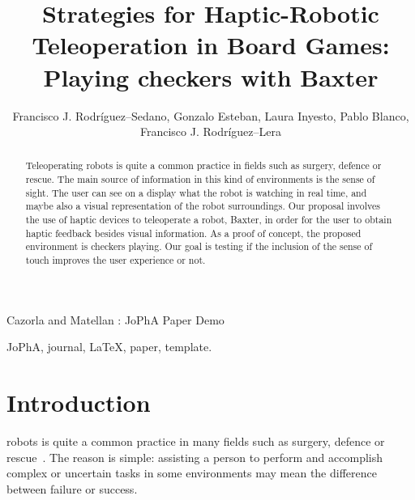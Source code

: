 \documentclass[journal,twoside]{JoPhA}
\begin{document}
\title{Strategies for Haptic-Robotic Teleoperation in Board Games: Playing checkers with Baxter}

\author{Francisco J. Rodr\'{i}guez--Sedano, Gonzalo Esteban, Laura Inyesto, Pablo Blanco, Francisco J. Rodr\'{i}guez--Lera

}


%
{Cazorla and Matellan : JoPhA Paper Demo}
\maketitle


\begin{abstract}
Teleoperating robots is quite a common practice in fields such as surgery, defence or rescue. The main source of information in this kind of environments is the sense of sight. The user can see on a display what the robot is watching in real time, and maybe also a visual representation of the robot surroundings. Our proposal involves the use of haptic devices to teleoperate a robot, Baxter, in order for the user to obtain haptic feedback besides visual information. As a proof of concept, the proposed environment is checkers playing. Our goal is testing if the inclusion of the sense of touch improves the user experience or not. 
\end{abstract}


\begin{IEEEkeywords}
JoPhA, journal, \LaTeX, paper, template.
\end{IEEEkeywords}


\section{Introduction}

   robots is quite a common practice in many fields such as surgery, defence or rescue~\cite{Vertut85}. The reason is simple: assisting a person to perform and accomplish complex or uncertain tasks in some environments may mean the difference between failure or success.
\end{document}
